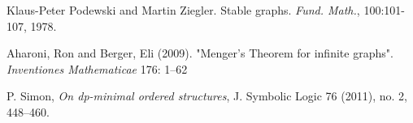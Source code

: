 \documentclass{amsart}
\begin{document}
\begin{thebibliography}{9}

	Klaus-Peter Podewski and Martin Ziegler. Stable graphs. \textit{Fund. Math.}, 100:101-107, 1978.

	Aharoni, Ron and Berger, Eli (2009). "Menger's Theorem for infinite graphs". \textit{Inventiones Mathematicae} 176: 1–62
	
	P. Simon, \textit{On dp-minimal ordered structures}, J. Symbolic Logic 76 (2011), no. 2, 448–460.


\end{thebibliography}
\end{document}
